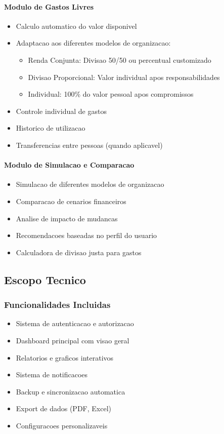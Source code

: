 \paragraph{Modulo de Gastos Livres}
\begin{itemize}
    \item Calculo automatico do valor disponivel
    \item Adaptacao aos diferentes modelos de organizacao:
    \begin{itemize}
        \item Renda Conjunta: Divisao 50/50 ou percentual customizado
        \item Divisao Proporcional: Valor individual apos responsabilidades
        \item Individual: 100\% do valor pessoal apos compromissos
    \end{itemize}
    \item Controle individual de gastos
    \item Historico de utilizacao
    \item Transferencias entre pessoas (quando aplicavel)
\end{itemize}

\paragraph{Modulo de Simulacao e Comparacao}
\begin{itemize}
    \item Simulacao de diferentes modelos de organizacao
    \item Comparacao de cenarios financeiros
    \item Analise de impacto de mudancas
    \item Recomendacoes baseadas no perfil do usuario
    \item Calculadora de divisao justa para gastos
\end{itemize}

\subsection{Escopo Tecnico}

\subsubsection{Funcionalidades Incluidas}
\begin{itemize}
    \item Sistema de autenticacao e autorizacao
    \item Dashboard principal com visao geral
    \item Relatorios e graficos interativos
    \item Sistema de notificacoes
    \item Backup e sincronizacao automatica
    \item Export de dados (PDF, Excel)
    \item Configuracoes personalizaveis
\end{itemize}

